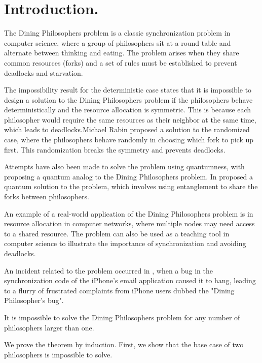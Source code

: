 \documentclass[manuscript,screen,review]{acmart}
\begin{document}
\section{Introduction.} 
The Dining Philosophers problem is a classic synchronization problem in computer science, where a group of philosophers sit at a round table and alternate between thinking and eating. The problem arises when they share common resources (forks) and a set of rules must be established to prevent deadlocks and starvation.

The impossibility result for the deterministic case states that it is impossible to design a solution to the Dining Philosophers problem if the philosophers behave deterministically and the resource allocation is symmetric. This is because each philosopher would require the same resources as their neighbor at the same time, which leads to deadlocks.Michael Rabin proposed a solution to the randomized case, where the philosophers behave randomly in choosing which fork to pick up first. This randomization breaks the symmetry and prevents deadlocks.

Attempts have also been made to solve the problem using quantumness, with   proposing a quantum analog to the Dining Philosophers problem. In  proposed a quantum solution to the problem, which involves using entanglement to share the forks between philosophers.

An example of a real-world application of the Dining Philosophers problem is in resource allocation in computer networks, where multiple nodes may need access to a shared resource. The problem can also be used as a teaching tool in computer science to illustrate the importance of synchronization and avoiding deadlocks.

An incident related to the problem occurred in , when a bug in the synchronization code of the iPhone's email application caused it to hang, leading to a flurry of frustrated complaints from iPhone users dubbed the "Dining Philosopher's bug".

\begin{theorem} 
 It is impossible to solve the Dining Philosophers problem for any number of philosophers larger than one.
\end{theorem}

  We prove the theorem by induction. First, we show that the base case of two philosophers is impossible to solve.
\end{document}
